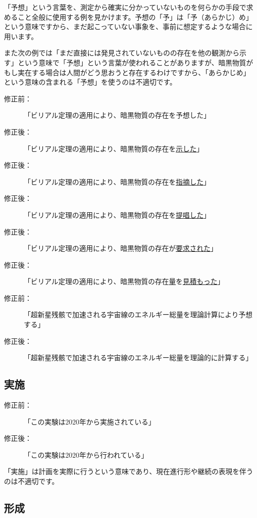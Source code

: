 「予想」という言葉を、測定から確実に分かっていないものを何らかの手段で求めること全般に使用する例を見かけます。予想の「予」は「予（あらかじ）め」という意味ですから、まだ起こっていない事象を、事前に想定するような場合に用います。

また次の例では「まだ直接には発見されていないものの存在を他の観測から示す」という意味で「予想」という言葉が使われることがありますが、暗黒物質がもし実在する場合は人間がどう思おうと存在するわけですから、「あらかじめ」という意味の含まれる「予想」を使うのは不適切です。

\begin{description}
\item[修正前：]「ビリアル定理の適用により、暗黒物質の存在を予想した」
\item[修正後：]「ビリアル定理の適用により、暗黒物質の存在を\underline{示した}」
\item[修正後：]「ビリアル定理の適用により、暗黒物質の存在を\underline{指摘した}」
\item[修正後：]「ビリアル定理の適用により、暗黒物質の存在を\underline{提唱した}」
\item[修正後：]「ビリアル定理の適用により、暗黒物質の存在が\underline{要求された}」
\item[修正後：]「ビリアル定理の適用により、暗黒物質の存在\underline{量}を\underline{見積もった}」
\end{description}

\begin{description}
\item[修正前：]「超新星残骸で加速される宇宙線のエネルギー総量を理論計算により予想する」
\item[修正後：]「超新星残骸で加速される宇宙線のエネルギー総量を理論的に計算する」
\end{description}

\subsection{実施}

\begin{description}
\item[修正前：]「この実験は2020年から実施されている」
\item[修正後：]「この実験は2020年から行われている」
\end{description}

「実施」は計画を実際に行うという意味であり、現在進行形や継続の表現を伴うのは不適切です。

\subsection{形成}

